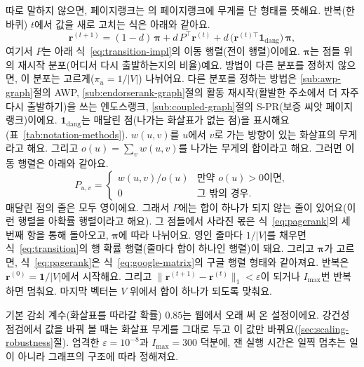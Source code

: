 따로 말하지 않으면, 페이지랭크는 \textcite{page1999pagerank}의 페이지랭크에 무게를 단 형태를 뜻해요. 반복(한 바퀴) $t$에서 값을 새로 고치는 식은 아래와 같아요.
\begin{equation}
\label{eq:pagerank}
\mathbf{r}^{(t+1)}
=
(1-d)\,\boldsymbol{\pi}
+
d\,P^{\top}\mathbf{r}^{(t)}
+
d\,\bigl(\mathbf{r}^{(t)\top}\mathbf{1}_{\mathrm{dang}}\bigr)\,\boldsymbol{\pi},
\end{equation}
여기서 $P$는 아래 식~\eqref{eq:transition-impl}의 이동 행렬(전이 행렬)이에요. $\boldsymbol{\pi}$는 점들 위의 재시작 분포(어디서 다시 출발하는지의 비율)예요. 방법이 다른 분포를 정하지 않으면, 이 분포는 고르게($\pi_u=1/|V|$) 나뉘어요. 다른 분포를 정하는 방법은 \ref{sub:awp-graph}절의 AWP, \ref{sub:endorserank-graph}절의 활동 재시작(활발한 주소에서 더 자주 다시 출발하기)을 쓰는 엔도스랭크, \ref{sub:coupled-graph}절의 \mbox{S-PR}(보증 씨앗 페이지랭크)이에요. $\mathbf{1}_{\mathrm{dang}}$는 매달린 점(나가는 화살표가 없는 점)을 표시해요(표~\ref{tab:notation-methods}). $w(u,v)$를 $u$에서 $v$로 가는 방향이 있는 화살표의 무게라고 해요. 그리고 $o(u)=\sum_v w(u,v)$를 나가는 무게의 합이라고 해요. 그러면 이동 행렬은 아래와 같아요.
\begin{equation}
\label{eq:transition-impl}
P_{u,v}
=
\begin{cases}
w(u,v)/o(u) & \text{만약 }o(u)>0\text{이면},\\
0 & \text{그 밖의 경우.}
\end{cases}
\end{equation}
매달린 점의 줄은 모두 영이에요. 그래서 $P$에는 합이 하나가 되지 않는 줄이 있어요(이런 행렬을 아확률 행렬이라고 해요). 그 점들에서 사라진 몫은 식~\eqref{eq:pagerank}의 세 번째 항을 통해 돌아오고, $\boldsymbol{\pi}$에 따라 나뉘어요. 영인 줄마다 $1/|V|$를 채우면 식~\eqref{eq:transition}의 행 확률 행렬(줄마다 합이 하나인 행렬)이 돼요. 그리고 $\boldsymbol{\pi}$가 고르면, 식~\eqref{eq:pagerank}은 식~\eqref{eq:google-matrix}의 구글 행렬 형태와 같아져요. 반복은 $\mathbf{r}^{(0)}=\mathbf{1}/|V|$에서 시작해요. 그리고 $\|\mathbf{r}^{(t+1)}-\mathbf{r}^{(t)}\|_1 < \varepsilon$이 되거나 $I_{\max}$번 반복하면 멈춰요. 마지막 벡터는 $V$ 위에서 합이 하나가 되도록 맞춰요.

기본 감쇠 계수(화살표를 따라갈 확률) $0.85$는 웹에서 오래 써 온 설정이에요\parencite{page1999pagerank,langville2006pagerank}. 강건성 점검에서 값을 바꿔 볼 때는 화살표 무게를 그대로 두고 이 값만 바꿔요(\ref{sec:scaling-robustness}절). 엄격한 $\varepsilon=10^{-8}$과 $I_{\max}=300$ 덕분에, 잰 실행 시간은 일찍 멈추는 일이 아니라 그래프의 구조에 따라 정해져요.

